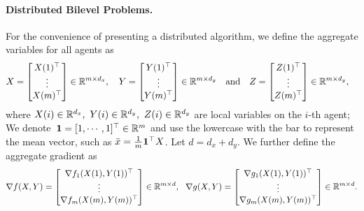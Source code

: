 \documentclass{article}
\begin{document}
\paragraph{Distributed Bilevel Problems.} For the convenience of presenting a distributed algorithm, we define the aggregate variables for all agents as
\begin{align*}
X=\begin{bmatrix}
X(1)^\top \\ \vdots \\ X(m)^\top
\end{bmatrix}&\in{\mathbb{R}}^{m\times d_x},
\quad
Y=\begin{bmatrix}
Y(1)^\top \\ \vdots \\ Y(m)^\top
\end{bmatrix}\in{\mathbb{R}}^{m\times d_y}
\quad \text{and} \quad
Z=\begin{bmatrix}
Z(1)^\top \\ \vdots \\ Z(m)^\top
\end{bmatrix}\in{\mathbb{R}}^{m\times d_y},
\end{align*}
where $X(i) \in {\mathbb{R}}^{d_x}, ~ Y(i) \in {\mathbb{R}}^{d_y},~Z(i) \in {\mathbb{R}}^{d_y}$ are local variables on the $i$-th agent; 
We denote~${\bf{1}} = [1,\cdots,1]^\top \in {\mathbb{R}}^m$ and use the lowercase with the bar to represent the mean vector, such as $\bar x = \frac{1}{m} {\bf{1}}^\top X$.
Let $d = d_x+d_y$. We further define the aggregate gradient as 
\begin{align*}
\nabla f(X,Y)=\begin{bmatrix}
\nabla f_1(X(1),Y(1))^\top \\ \vdots \\ \nabla f_m(X(m),Y(m))^\top
\end{bmatrix}
\in{\mathbb{R}}^{m\times d}, ~~\nabla g(X,Y)=\begin{bmatrix}
\nabla g_1(X(1),Y(1))^\top \\ \vdots \\ \nabla g_m(X(m),Y(m))^\top
\end{bmatrix}
\in{\mathbb{R}}^{m\times d}.    
\end{align*}

\end{document}
